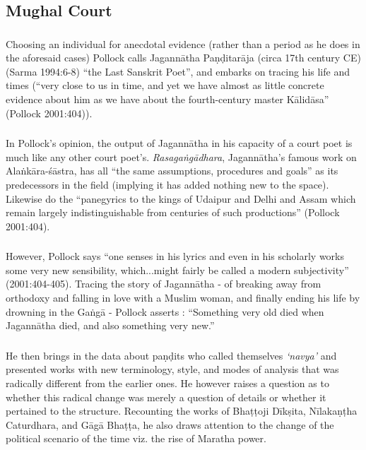 \subsection{Mughal Court}
\vskip -5pt

\subsubsection{} Choosing an individual for anecdotal evidence (rather than a period as he does in the aforesaid cases) Pollock calls Jagannātha Paṇḍitarāja (circa 17th century CE) (Sarma 1994:6-8) “the Last Sanskrit Poet”, and embarks on tracing his life and times (“very close to us in time, and yet we have almost as little concrete evidence about him as we have about the fourth-century master Kālidāsa” (Pollock 2001:404)).

\subsubsection{} In Pollock’s opinion, the output of Jagannātha in his capacity of a court poet is much like any other court poet’s. {\sl Rasagaṅgādhara}, Jagannātha’s famous work on Alaṅkāra-śāstra, has all “the same assumptions, procedures and goals” as its predecessors in the field (implying it has added nothing new to the space). Likewise do the “panegyrics to the kings of Udaipur and Delhi and Assam which remain largely indistinguishable from centuries of such productions” (Pollock 2001:404).

\subsubsection{} However, Pollock says “one senses in his lyrics and even in his scholarly works some very new sensibility, which...might fairly be called a modern subjectivity” (2001:404-405). Tracing the story of Jagannātha - of breaking away from orthodoxy and falling in love with a Muslim woman, and finally ending his life by drowning in the Gaṅgā -  Pollock asserts : “Something very old died when Jagannātha died, and also something very new.”

\subsubsection{} He then brings in the data about paṇḍits who called themselves {\sl ‘navya’} and presented works with new terminology, style, and modes of analysis that was radically different from the earlier ones. He however raises a question as to whether this radical change was merely a question of details or whether it pertained to the structure. Recounting the works of Bhaṭṭoji Dīkṣita, Nīlakaṇṭha Caturdhara, and Gāgā Bhaṭṭa, he also draws attention to the change of the political scenario of the time viz. the rise of Maratha power.

